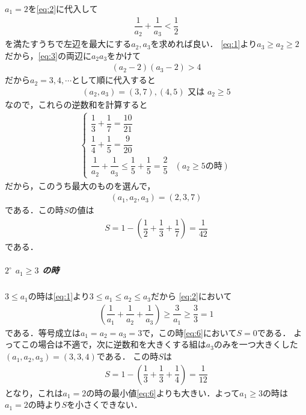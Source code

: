 \documentclass[../../main.tex]{subfiles}
\begin{document}
$a_1=2$を\cref{eq:2}に代入して
\begin{align}
  \dfrac{1}{a_2} + \dfrac{1}{a_3} < \dfrac{1}{2} \label{eq:3}
\end{align}
を満たすうちで左辺を最大にする$a_2,a_3$を求めれば良い．
\cref{eq:1}より$a_3 \ge a_2 \ge 2$ だから，\cref{eq:3}の両辺に$a_2a_3$をかけて
\begin{align}
  (a_2-2)(a_3-2) > 4 \label{eq:4}
\end{align}
だから$a_2=3,4,\cdots$として順に代入すると
\begin{align}
  (a_2, a_3) = (3, 7), (4, 5) \text{ 又は } a_2 \ge 5
\end{align}
なので，これらの逆数和を計算すると
\begin{align}
  \begin{cases}
    \dfrac{1}{3}+\dfrac{1}{7} = \dfrac{10}{21} \\
    \dfrac{1}{4}+\dfrac{1}{5} = \dfrac{9}{20} \\
    \dfrac{1}{a_2}+\dfrac{1}{a_3} \le \dfrac{1}{5}+\dfrac{1}{5}=\dfrac{2}{5}  & (a_2 \ge 5 \text{の時})
  \end{cases}
\end{align}
だから，このうち最大のものを選んで，
\begin{align}
  (a_1, a_2, a_3) = (2, 3, 7) \label{eq:5}
\end{align}
である．この時$S$の値は
\begin{align}
  S =  1 - \left( \dfrac{1}{2} + \dfrac{1}{3} + \dfrac{1}{7} \right) = \dfrac{1}{42} \label{eq:6}
\end{align}
である．

\subparagraph{$2^\circ$ $a_1 \ge 3$ の時}

$3 \le a_1$の時は\cref{eq:1}より$3 \le a_1 \le a_2 \le a_3$だから
\cref{eq:2}において
\begin{align}
  \left( \dfrac{1}{a_1} + \dfrac{1}{a_2} + \dfrac{1}{a_3} \right)
  \ge \dfrac{3}{a_1} \ge \dfrac{3}{3} = 1
\end{align}
である．等号成立は$a_1=a_2=a_3=3$で，この時\cref{eq:6}において$S=0$である．
よってこの場合は不適で，次に逆数和を大きくする組は$a_3$のみを一つ大きくした$(a_1,a_2,a_3)=(3,3,4)$である．
この時$S$は
\begin{align}
  S = 1 - \left( \dfrac{1}{3} + \dfrac{1}{3} + \dfrac{1}{4} \right) = \dfrac{1}{12}
\end{align}
となり，これは$a_1=2$の時の最小値\cref{eq:6}よりも大きい．よって$a_1 \ge 3$の時は$a_1=2$の時より$S$を小さくできない．
\casesend
\end{document}

